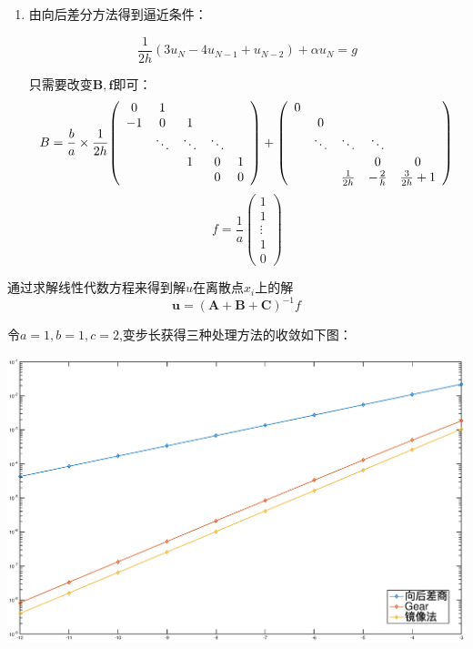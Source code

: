 \documentclass{ctexart}
\begin{document}
\begin{enumerate}
\begin{enumerate}
\begin{enumerate}
\item 由向后差分方法得到逼近条件：

\[ \frac{1}{2h}(3u_N-4u_{N-1}+u_{N-2})+\alpha u_N=g\]

只需要改变\(\bm{B}, \bm{f}\)即可：
\begin{equation*}
B=\frac{b}{a}\times\frac{1}{2h}{
\left ( \begin{array}{ccccc}
0 & 1 &  & &  \\
-1& 0 & 1 & & \\
  & \ddots & \ddots &\ddots & \\
  & &\-1 &0 &1\\
  &  & &0 &0
\end{array} 
\right )}
+{
\left ( \begin{array}{ccccc}
 0&  &  & &  \\
&0  & & & \\
  & \ddots & \ddots &\ddots & \\
  & &\ &0 &0\\
  &  & \frac{1}{2h}&-\frac{2}{h} &\frac{3}{2h}+1
\end{array} 
\right )}
\end{equation*}
\begin{equation*}
f=\frac{1}{a}{
\left ( \begin{array}{c}
1\\
1\\
\vdots \\
1\\
0
\end{array} 
\right )}
\end{equation*}

\end{enumerate}

通过求解线性代数方程来得到解\(u\)在离散点\(x_i\)上的解
\[
\bm{u}=(\bm{A}+\bm{B}+\bm{C})^{-1}f
\]  

令\(a=1,b=1,c=2\),变步长获得三种处理方法的收敛如下图：


\centerline{\includegraphics[width=5.5in]{H8_3_1.eps}}


\end{enumerate}






\end{enumerate}
\end{document}
